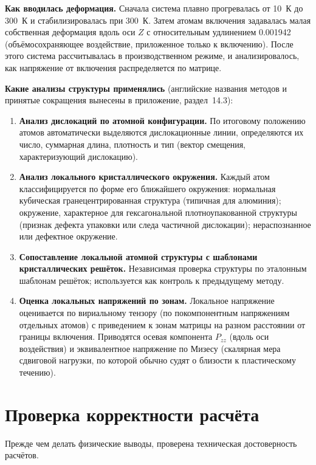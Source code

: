 \documentclass[12pt,a4paper]{extarticle}
\begin{document}
\smallskip
\noindent\textbf{Как вводилась деформация.} Сначала система плавно прогревалась от 10~К до 300~К и стабилизировалась при 300~К. Затем атомам включения задавалась малая собственная деформация вдоль оси $Z$ с относительным удлинением 0.001942 (объёмосохраняющее воздействие, приложенное только к включению). После этого система рассчитывалась в производственном режиме, и анализировалось, как напряжение от включения распределяется по матрице.

\smallskip
\noindent\textbf{Какие анализы структуры применялись} (английские названия методов и принятые сокращения вынесены в приложение, раздел~14.3):
\begin{enumerate}[leftmargin=1.6em,itemsep=3pt,topsep=2pt]
\item \textbf{Анализ дислокаций по атомной конфигурации.} По итоговому положению атомов автоматически выделяются дислокационные линии, определяются их число, суммарная длина, плотность и тип (вектор смещения, характеризующий дислокацию).
\item \textbf{Анализ локального кристаллического окружения.} Каждый атом классифицируется по форме его ближайшего окружения: нормальная кубическая гранецентрированная структура (типичная для алюминия); окружение, характерное для гексагональной плотноупакованной структуры (признак дефекта упаковки или следа частичной дислокации); нераспознанное или дефектное окружение.
\item \textbf{Сопоставление локальной атомной структуры с шаблонами кристаллических решёток.} Независимая проверка структуры по эталонным шаблонам решёток; используется как контроль к предыдущему методу.
\item \textbf{Оценка локальных напряжений по зонам.} Локальное напряжение оценивается по вириальному тензору (по покомпонентным напряжениям отдельных атомов) с приведением к зонам матрицы на разном расстоянии от границы включения. Приводятся осевая компонента $P_{zz}$ (вдоль оси воздействия) и эквивалентное напряжение по Мизесу (скалярная мера сдвиговой нагрузки, по которой обычно судят о близости к пластическому течению).
\end{enumerate}

\section{Проверка корректности расчёта}
Прежде чем делать физические выводы, проверена техническая достоверность расчётов.
\end{document}
